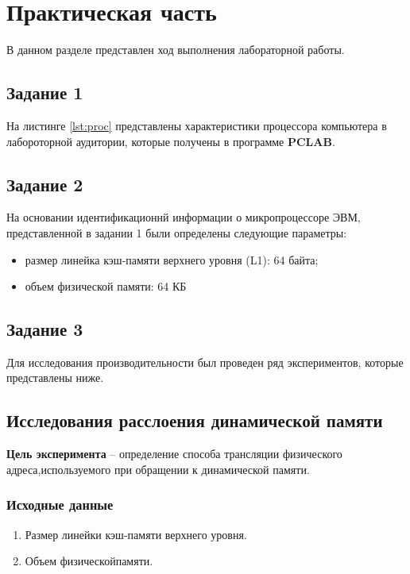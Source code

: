 \chapter{Практическая часть}

В данном разделе представлен ход выполнения лабораторной работы.

\section{Задание 1}

На листинге \ref{lst:proc} представлены характеристики процессора компьютера
в лабороторной аудитории, которые получены в программе \textbf{PCLAB}.


\section{Задание 2}

На основании идентификационнй информации о микропроцессоре ЭВМ, представленной в задании 1 были определены следующие параметры:
\begin{itemize}
    \item размер линейка кэш-памяти верхнего уровня (L1): 64 байта;
    \item объем физической памяти: 64 КБ
\end{itemize}

\section{Задание 3}

Для исследования производительности был проведен ряд экспериментов, которые представлены ниже.


\section{Исследования расслоения динамической памяти}

\textbf{Цель эксперимента} -- определение   способа   трансляции   физического   адреса,используемого при обращении к динамической памяти.

\subsection{Исходные данные}
\begin{enumerate}
	\item Размер линейки кэш-памяти верхнего уровня.
	\item Объем физическойпамяти.
\end{enumerate}

